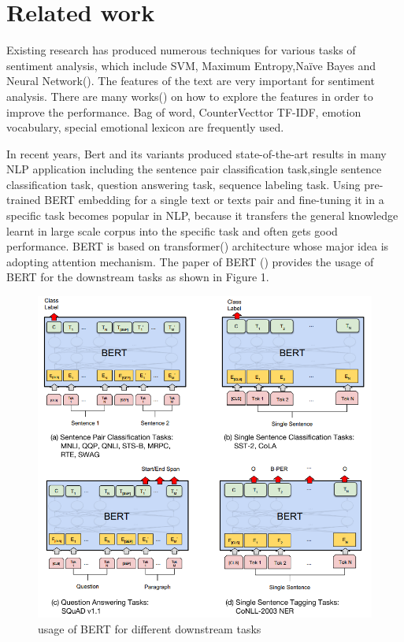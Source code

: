 \documentclass[12pt,twocolumn,letterpaper]{article}
\begin{document}
\section{Related work}
Existing research has produced numerous techniques for various tasks of sentiment analysis, which include SVM, Maximum Entropy,Naïve Bayes and Neural Network(\cite{Ref3}). The features of the text are very important for sentiment analysis. There are many works(\cite{Ref6}) on how to explore the features in order to improve the performance. Bag of word, CounterVecttor TF-IDF, emotion vocabulary, special emotional lexicon are frequently used.  

In recent years, Bert and its variants produced state-of-the-art results in many NLP application including the sentence pair classification task,single sentence classification task, question answering task, sequence labeling task. Using pre-trained BERT embedding for a single text or texts pair and fine-tuning it in a specific task becomes popular in NLP, because it transfers the general knowledge learnt in large scale corpus into the specific task and often gets good performance. BERT is based on transformer(\cite{ref5}) architecture whose major idea is adopting attention mechanism. The paper of BERT (\cite{Ref4}) provides the usage of BERT for the downstream tasks as shown in Figure 1.



\begin{figure}
\begin{center}
\includegraphics[scale=0.9]{bert_all.png}
\end{center}
   \caption{usage of BERT for different downstream tasks}
\label{fig:short}
\end{figure}
\end{document}
